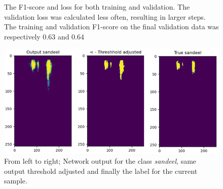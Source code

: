         \clearpage
        \begin{figure}[H]
            \centering
            \qquad
            \caption[Loss and F1 score during training]{The F1-score and loss for both training and validation. The validation loss was calculated less often, resulting in larger steps. The training and validation F1-score on the final validation data was respectively 0.63 and 0.64}%
            \label{loss_f1_duo_plot_fig}%
        \end{figure}
            
        \begin{figure}[H]
            \centering
            \includegraphics[scale=0.6]{figures/SANDEEL_WITH_LABEL.png}
            \caption[Examle output, threshold and label]{From left to right; Network output for the class \textit{sandeel}, same output threshold adjusted and finally the label for the current sample.}
          	\medskip 
            \label{sandeel_threshold_label}
        \end{figure}
    
